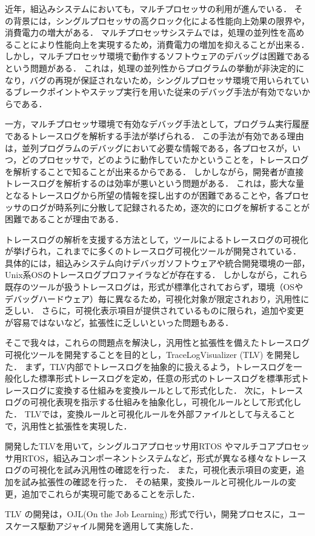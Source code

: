 近年，組込みシステムにおいても，マルチプロセッサの利用が進んでいる．
その背景には，シングルプロセッサの高クロック化による性能向上効果の限界や，消費電力の増大がある．
マルチプロセッサシステムでは，処理の並列性を高めることにより性能向上を実現するため，消費電力の増加を抑えることが出来る．
しかし，マルチプロセッサ環境で動作するソフトウェアのデバッグは困難であるという問題がある．
これは，処理の並列性からプログラムの挙動が非決定的になり，バグの再現が保証されないため，シングルプロセッサ環境で用いられているブレークポイントやステップ実行を用いた従来のデバッグ手法が有効でないからである．

一方，マルチプロセッサ環境で有効なデバッグ手法として，プログラム実行履歴であるトレースログを解析する手法が挙げられる．
この手法が有効である理由は，並列プログラムのデバッグにおいて必要な情報である，各プロセスが，いつ，どのプロセッサで，どのように動作していたかということを，トレースログを解析することで知ることが出来るからである．
しかしながら，開発者が直接トレースログを解析するのは効率が悪いという問題がある．
これは，膨大な量となるトレースログから所望の情報を探し出すのが困難であることや，各プロセッサのログが時系列に分散して記録されるため，逐次的にログを解析することが困難であることが理由である．

トレースログの解析を支援する方法として，ツールによるトレースログの可視化が挙げられ，これまでに多くのトレースログ可視化ツールが開発されている．
具体的には，組込みシステム向けデバッガソフトウェアや統合開発環境の一部，Unix系OSのトレースログプロファイラなどが存在する．
しかしながら，これら既存のツールが扱うトレースログは，形式が標準化されておらず，環境（OSやデバッグハードウェア）毎に異なるため，可視化対象が限定されおり，汎用性に乏しい．
さらに，可視化表示項目が提供されているものに限られ，追加や変更が容易ではないなど，拡張性に乏しいといった問題もある．

そこで我々は，これらの問題点を解決し，汎用性と拡張性を備えたトレースログ可視化ツールを開発することを目的とし，TraceLogVisualizer (TLV) を開発した．
まず，TLV内部でトレースログを抽象的に扱えるよう，トレースログを一般化した標準形式トレースログを定め，任意の形式のトレースログを標準形式トレースログに変換する仕組みを変換ルールとして形式化した．
次に，トレースログの可視化表現を指示する仕組みを抽象化し，可視化ルールとして形式化した．
TLVでは，変換ルールと可視化ルールを外部ファイルとして与えることで，汎用性と拡張性を実現した．

開発したTLVを用いて，シングルコアプロセッサ用RTOS やマルチコアプロセッサ用RTOS，組込みコンポーネントシステムなど，形式が異なる様々なトレースログの可視化を試み汎用性の確認を行った．
また，可視化表示項目の変更，追加を試み拡張性の確認を行った．
その結果，変換ルールと可視化ルールの変更，追加でこれらが実現可能であることを示した．

TLV の開発は，OJL(On the Job Learning) 形式で行い，開発プロセスに，ユースケース駆動アジャイル開発を適用して実施した．
